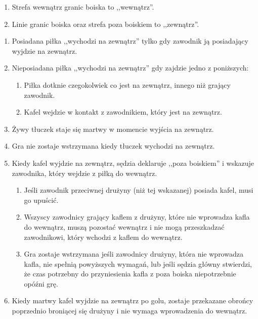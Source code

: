 \documentclass[11pt,a4paper]{article}
\renewcommand{\subsubsection}[1]{
  \oldsubsubsection{#1}%
  \label{\thesubsubsection}
}
\begin{document}
\subsubsection{Zewnątrz}
\begin{enumerate}
  \item Strefa wewnątrz granic boiska to ,,wewnątrz''.
  \item Linie granic boiska oraz strefa poza boiskiem to ,,zewnątrz''.
\end{enumerate}

\subsubsection{Granice i piłki}
\begin{enumerate}
  \item Posiadana piłka ,,wychodzi na zewnątrz'' tylko gdy zawodnik ją posiadający wyjdzie na zewnątrz.
  \item Nieposiadana piłka ,,wychodzi na zewnątrz'' gdy zajdzie jedno z poniższych:
  \begin{enumerate}
    \item Piłka dotknie czegokolwiek co jest na zewnątrz, innego niż grający zawodnik.
    \item Kafel wejdzie w kontakt z zawodnikiem, który jest na zewnątrz.
  \end{enumerate}
  \item Żywy tłuczek staje się martwy w momencie wyjścia na zewnątrz.
  \item Gra nie zostaje wstrzymana kiedy tłuczek wychodzi na zewnątrz.
  \item Kiedy kafel wyjdzie na zewnątrz, sędzia deklaruje ,,poza boiskiem'' i wskazuje zawodnika, który wejdzie z piłką do wewnątrz.
  \begin{enumerate}
    \item Jeśli zawodnik przeciwnej drużyny (niż tej wskazanej) posiada kafel, musi go upuścić.
    \item Wszyscy zawodnicy grający kaflem z drużyny, które nie wprowadza kafla do wewnątrz, muszą pozostać wewnątrz i nie mogą przeszkadzać zawodnikowi, który wchodzi z kaflem do wewnątrz.
    \item Gra zostaje wstrzymana jeśli zawodnicy drużyny, która nie wprowadza kafla, nie spełnią powyższych wymagań, lub jeśli sędzia główny stwierdzi, że czas potrzebny do przyniesienia kafla z poza boiska niepotrzebnie opóźni grę.
  \end{enumerate}
  \item Kiedy martwy kafel wyjdzie na zewnątrz po golu, zostaje przekazane obrońcy poprzednio broniącej się drużyny i nie wymaga wprowadzenia do wewnątrz.

\end{enumerate}
\end{document}
